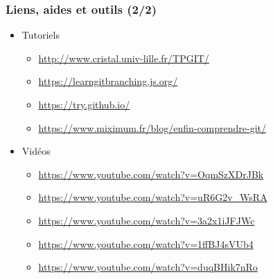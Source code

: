 \documentclass[table,tikz,12pt,svgnames]{beamer}
\begin{document}
\begin{frame}
\frametitle{Liens, aides et outils (2/2)}
\begin{itemize}
	\item Tutoriels
	\begin{itemize}
		\item \url{http://www.cristal.univ-lille.fr/TPGIT/}
		\item \url{https://learngitbranching.js.org/}
		\item \url{https://try.github.io/}
		\item \url{https://www.miximum.fr/blog/enfin-comprendre-git/}
	\end{itemize}
	\item Vidéos
	\begin{itemize}
		\item \url{https://www.youtube.com/watch?v=OqmSzXDrJBk}
		\item \url{https://www.youtube.com/watch?v=uR6G2v_WsRA}
		\item \url{https://www.youtube.com/watch?v=3a2x1iJFJWc}
		\item \url{https://www.youtube.com/watch?v=1ffBJ4sVUb4}
		\item \url{https://www.youtube.com/watch?v=duqBHik7nRo}
	\end{itemize}
\end{itemize}
\end{frame}


\end{document}
